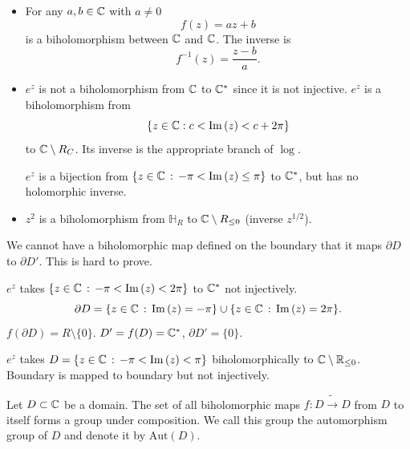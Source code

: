 \documentclass[10pt, a4paper]{article}
\begin{document}
\begin{example}\phantom{}
    \begin{itemize}
        \item For any $a, b \in \mathbb{C}$ with $a \neq 0$
        \[
        f(z) = az + b
        \]
        is a biholomorphism between $\mathbb{C}$ and $\mathbb{C}$.
        The inverse is
        \[
        f ^ {-1}(z) = \frac{z - b}{a}.
        \]

        \item $e ^ z$ is not a biholomorphism from $\mathbb{C}$ to $\mathbb{C} ^ {*}$ since it is not injective.
        $e ^ z$ is a biholomorphism from
        \[
        \{z \in \mathbb{C} : c < \mathrm{Im}\,(z) < c + 2\pi\}
        \]
        to $\mathbb{C} \setminus R_{C}$.
        Its inverse is the appropriate branch of $\log$.

        $e ^ z$ is a bijection from $\{z \in \mathbb{C}\,:\, -\pi < \mathrm{Im}\,(z) \leq \pi\}$ to $\mathbb{C} ^ {*}$,
        but has no holomorphic inverse.

        \item $z ^ 2$ is a biholomorphism from $\mathbb{H}_{R}$ to $\mathbb{C} \setminus R_{\leq 0}$
        (inverse $z ^ {1 / 2}$).
    \end{itemize}
\end{example}

We cannot have a biholomorphic map defined on the boundary that it maps $\partial D$ to $\partial D'$.
This is hard to prove.

\begin{example}
    $e ^ z$ takes $\{z \in \mathbb{C}\,:\, -\pi < \mathrm{Im}\,(z) < 2\pi\}$ to $\mathbb{C} ^ {*}$ not injectively.
    \[
    \partial D = \{z \in \mathbb{C}\,:\, \mathrm{Im}\,(z) = -\pi\} \cup \{z \in \mathbb{C}\,:\, \mathrm{Im}\,(z) = 2\pi\}.
    \]
    $f(\partial D) = R \setminus \{0\}$.
    $D' = f(D) = \mathbb{C} ^ {*}$,
    $\partial D' = \{0\}$.
\end{example}

\begin{example}
    $e ^ z$ takes $D = \{z \in \mathbb{C}\,:\, -\pi < \mathrm{Im}\,(z) < \pi\}$ biholomorphically to $\mathbb{C} \setminus \mathbb{R}_{\leq 0}$.
    Boundary is mapped to boundary but not injectively.
\end{example}

\begin{lemma}
    Let $D \subset \mathbb{C}$ be a domain.
    The set of all biholomorphic maps $f : D \tilde{\to} D$ from $D$ to itself forms a group under composition.
    We call this group the automorphism group of $D$ and denote it by $\mathrm{Aut}(D)$.
\end{lemma}
\end{document}
